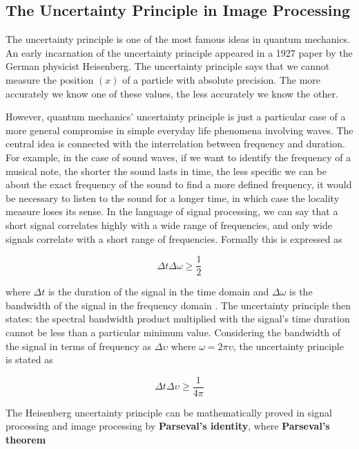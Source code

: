 \subsection{The Uncertainty Principle in Image Processing}\label{ch:uncertainty_principle}

The uncertainty principle is one of the most famous ideas in quantum mechanics. An early incarnation of the uncertainty principle appeared in a 1927 paper by the German physicist Heisenberg. The uncertainty principle says that we cannot measure the position $(x)$ of a particle with absolute precision. The more accurately we know one of these values, the less accurately we know the other.

However, quantum mechanics' uncertainty principle is just a particular case of a more general compromise in simple everyday life phenomena involving waves. The central idea is connected with the interrelation between frequency and duration. For example, in the case of sound waves, if we want to identify the frequency of a musical note, the shorter the sound lasts in time, the less specific we can be about the exact frequency of the sound to find a more defined frequency, it would be necessary to listen to the sound for a longer time, in which case the locality measure loses its sense. In the language of signal processing, we can say that a short signal correlates highly with a wide range of frequencies, and only wide signals correlate with a short range of frequencies. Formally this is expressed as

\begin{equation}\label{eq:uncertainty_principle_rad}
	\Delta t\Delta \omega \geq \frac{1}{2}
\end{equation}

where $\Delta t$ is the duration of the signal in the time domain and $\Delta \omega$ is the bandwidth of the signal in the frequency domain \citep{Petrou.Sevilla:Book:2006}. The uncertainty principle then states: the spectral bandwidth product multiplied with the signal's time duration cannot be less than a particular minimum value. Considering the bandwidth of the signal in terms of frequency as $\Delta \upsilon$ where $\omega = 2\pi \upsilon$, the uncertainty principle is stated as 

\begin{equation}\label{eq:uncertainty_principle_freq}
	\Delta t\Delta \upsilon \geq \frac{1}{4\pi}
\end{equation}

The Heisenberg uncertainty principle can be mathematically proved in signal processing and image processing by \textbf{Parseval's identity}, where \textbf{Parseval's theorem}

